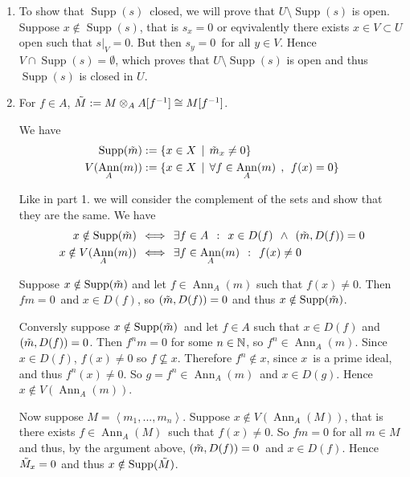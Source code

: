 \documentclass[a4paper,11pt,english]{article}
\DeclareMathOperator{\Ann}{Ann}
\DeclareMathOperator{\Supp}{Supp}
\begin{document}
\newpage
\begin{exercise}[3]
\begin{enumerate}
\item %
To show that $\Supp(s)$ closed, we will prove that $U \setminus \Supp(s)$ is
open. Suppose $x \notin \Supp(s)$, that is $s_x = 0$ or eqvivalently there 
exists $x \in V \subset U$ open such that $s|_V = 0$. But then $s_y = 0$ for all
$y\in V$. Hence $V \cap \Supp(s) = \emptyset$, which proves that $U \setminus
\Supp(s)$ is open and thus $\Supp(s)$ is closed in $U$.


\item %
For $f\in A$, $\tilde{M} := M \otimes_A A[f^{-1}] \cong M[f^{-1}]$. 

We have 
\begin{align*}
\Supp(\tm) &:= \{ x \in X \q| \tm_x \ne 0 \}  \\
V(\Ann_A(m)) &:= \{ x \in X \q| \forall f \in \Ann_A(m) \q, f(x) = 0  \} 
\end{align*}

Like in part 1. we will consider the complement of the sets and show that they
are the same. We have
\begin{align*}
x \notin \Supp(\tm) &\q\lra \exists f \in A \q: x \in D(f) \q\land (\tm, D(f)) = 0 \\
x \notin V(\Ann_A(m)) &\q\lra \exists f \in \Ann_A(m)\q: f(x) \ne 0 \\
\end{align*}

Suppose $x \notin \Supp(\tm)$ and let $f \in \Ann_A(m)$ such that $f(x) \ne 0$.
Then $f m = 0$ and $x \in D(f)$, so $(\tilde{m}, D(f)) = 0$ and thus $x \notin
\Supp(\tm)$.

Conversly suppose $x \notin \Supp(\tm)$ and let $f \in A$ such that $x \in
D(f)$ and $(\tilde{m}, D(f)) = 0$. Then $f^n m = 0$ for some $n \in \mathbb{N}$, so $f^n \in
\Ann_A(m)$. Since $x \in D(f)$, $f(x) \ne 0$ so $f \not\subseteq x$. Therefore 
$f^n \notin x$, since $x$ is a prime ideal, and thus $f^n(x) \ne 0$. So $g = f^n
\in \Ann_A(m)$ and $x \in D(g)$. Hence $x \notin V(\Ann_A(m))$.

Now suppose $M = \left<m_1, ..., m_n\right>$. 
Suppose $x \notin V(\Ann_A(M))$, that is there exists $f \in \Ann_A(M)$ such
that $f(x) \ne 0$. So $fm = 0$ for all $m \in M$ and thus,
by the argument above, $(\tilde{m}, D(f)) = 0$ and $x\in D(f)$. Hence $\tilde{M}_x = 0$ and
thus $x \notin \Supp(\tM)$.


\end{enumerate}
\end{exercise}
\end{document}
